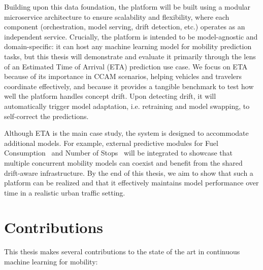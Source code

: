 Building upon this data foundation, the platform will be built using a modular microservice architecture to ensure scalability and flexibility, where each component (orchestration, model serving, drift detection, etc.) operates as an independent service.
Crucially, the platform is intended to be model-agnostic and domain-specific: it can host any machine learning model for mobility prediction tasks, but this thesis will demonstrate and evaluate it primarily through the lens of an Estimated Time of Arrival (ETA) prediction use case.
We focus on ETA because of its importance in CCAM scenarios, helping vehicles and travelers coordinate effectively, and because it provides a tangible benchmark to test how well the platform handles concept drift.
Upon detecting drift, it will automatically trigger model adaptation, i.e. retraining and model swapping, to self-correct the predictions.

Although ETA is the main case study, the system is designed to accommodate additional models. For example, external predictive modules for Fuel Consumption~\cite{angelis2025fuel} and Number of Stops~\cite{tzelepis2025stops} will be integrated to showcase that multiple concurrent mobility models can coexist and benefit from the shared drift-aware infrastructure.
By the end of this thesis, we aim to show that such a platform can be realized and that it effectively maintains model performance over time in a realistic urban traffic setting.

\section{Contributions}

This thesis makes several contributions to the state of the art in continuous machine learning for mobility:

